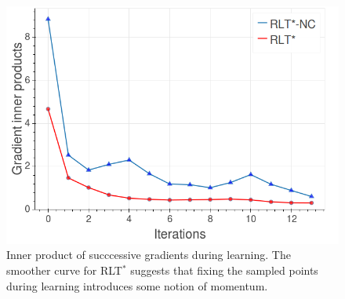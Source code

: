 \documentclass[letterpaper, 10 pt, conference]{ieeeconf}
\begin{document}
 	\begin{figure}[tbh]
	\centering
    \includegraphics[scale=0.23]{images/momentum.png}
    \caption{Inner product of succcessive gradients during learning. The smoother curve for RLT$^*$ suggests that fixing the sampled points during learning introduces some notion of momentum. }
    \vspace{-2mm}
  \label{fig:in_prod_grad}
  \end{figure}
\end{document}
